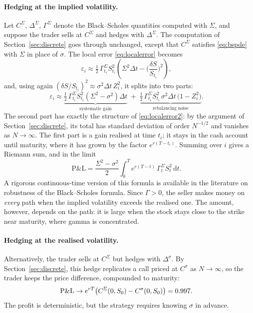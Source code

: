 \documentclass[11pt,a4paper]{article}
\newcommand{\dd}{\mathrm{d}}
\newcommand{\PnL}{\text{P\&L}}
\begin{document}
\paragraph{Hedging at the implied volatility.} Let $C^\Sigma$, $\Delta^\Sigma$, $\Gamma^\Sigma$ denote the Black--Scholes quantities computed with $\Sigma$, and suppose the trader sells at $C^\Sigma$ and hedges with $\Delta^\Sigma$. The computation of Section~\ref{sec:discrete} goes through unchanged, except that $C^\Sigma$ satisfies \eqref{eq:bspde} with $\Sigma$ in place of $\sigma$. The local error \eqref{eq:localerror} becomes
\[
  \varepsilon_i \approx \tfrac12\,\Gamma^\Sigma_{t_i} S_{t_i}^2\left(\Sigma^2\Delta t - \Big(\frac{\delta S}{S_{t_i}}\Big)^2\right),
\]
and, using again $(\delta S/S_{t_i})^2 \approx \sigma^2\Delta t\,Z_i^2$, it splits into two parts:
\begin{equation}\label{eq:split}
  \varepsilon_i \approx
  \underbrace{\tfrac12\,\Gamma^\Sigma_{t_i} S_{t_i}^2\left(\Sigma^2 - \sigma^2\right)\Delta t}_{\text{systematic gain}}
  \;+\;
  \underbrace{\tfrac12\,\Gamma^\Sigma_{t_i} S_{t_i}^2\,\sigma^2\Delta t\,\big(1 - Z_i^2\big)}_{\text{rebalancing noise}} .
\end{equation}
The second part has exactly the structure of \eqref{eq:localerror2}: by the argument of Section~\ref{sec:discrete}, its total has standard deviation of order $N^{-1/2}$ and vanishes as $N\to\infty$. The first part is a gain realised at time $t_i$; it stays in the cash account until maturity, where it has grown by the factor $e^{r(T-t_i)}$. Summing over $i$ gives a Riemann sum, and in the limit
\begin{equation}\label{eq:gammapnl}
  \PnL = \frac{\Sigma^2 - \sigma^2}{2}\int_0^T e^{r(T-t)}\,\Gamma^\Sigma_t S_t^2\,\dd t .
\end{equation}
A rigorous continuous-time version of this formula is available in the literature on robustness of the Black--Scholes formula. Since $\Gamma > 0$, the seller makes money on \emph{every} path when the implied volatility exceeds the realised one. The amount, however, depends on the path: it is large when the stock stays close to the strike near maturity, where gamma is concentrated.

\paragraph{Hedging at the realised volatility.} Alternatively, the trader sells at $C^\Sigma$ but hedges with $\Delta^\sigma$. By Section~\ref{sec:discrete}, this hedge replicates a call priced at $C^\sigma$ as $N\to\infty$, so the trader keeps the price difference, compounded to maturity:
\begin{equation}\label{eq:lockedin}
  \PnL \to e^{rT}\big(C^\Sigma(0,S_0) - C^\sigma(0,S_0)\big) = \PriceGap .
\end{equation}
The profit is deterministic, but the strategy requires knowing $\sigma$ in advance.
\end{document}
